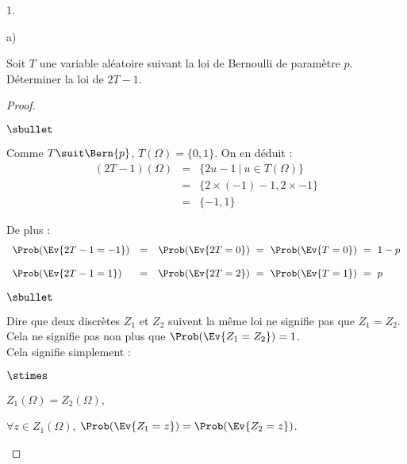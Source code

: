 \begin{noliste}{1.}
\item
  \begin{noliste}{a)}
    \setlength{\itemsep}{2mm}
  \item Soit $T$ une variable aléatoire suivant la loi de Bernoulli de
    paramètre $p$.\\
    Déterminer la loi de $2T-1$.

    \begin{proof}~
      \begin{noliste}{$\sbullet$}
      \item Comme $T \suit \Bern{p}$, $T(\Omega) = \{0,
        1\}$. On en déduit :
        \[
        \begin{array}{rcl}
          (2T-1)(\Omega) & = & \{ 2 u - 1 \ | \ u \in T(\Omega) \} 
          \\[.2cm]
          & = & \{2 \times (-1) - 1, 2 \times - 1\} 
          \\[.2cm]
          & = & \{-1, 1\}
        \end{array}
        \]

      \item De plus :
        \[
        \begin{array}{lcl}
          \Prob(\Ev{2T-1 = -1}) & = & \Prob(\Ev{2T = 0}) \ = \ \Prob(\Ev{T = 0})
          \ = \ 1 - p \\[.4cm]
          \Prob(\Ev{2T-1 = 1}) & = & \Prob(\Ev{2T = 2}) \ = \ \Prob(\Ev{T = 1})
          \ = \ p
        \end{array}
        \]
      \end{noliste}
      \begin{remarkL}{.97}%
        \begin{noliste}{$\sbullet$}
        \item Dire que deux \var discrètes $Z_1$ et $Z_2$ suivent la même
          loi ne signifie pas que $Z_1 = Z_2$.\\
          Cela ne signifie pas non plus que $\Prob(\Ev{Z_1 = Z_2}) = 1$.\\
          Cela signifie simplement :
          \begin{noliste}{$\stimes$}
          \item $Z_1(\Omega) = Z_2(\Omega)$,
          \item $\forall z \in Z_1(\Omega)$, $\Prob(\Ev{Z_1 = z}) =
            \Prob(\Ev{Z_2 = z})$.
          \end{noliste}


\end{noliste}
\end{remarkL}
\end{proof}
\end{noliste}
\end{noliste}
